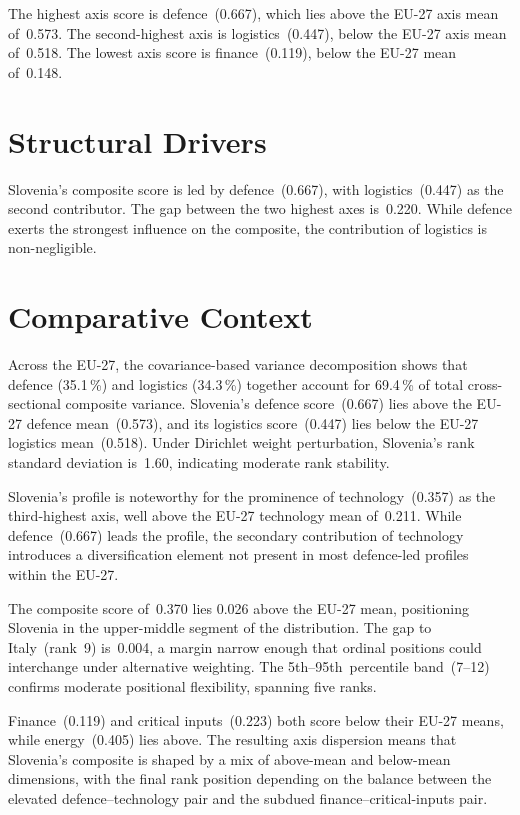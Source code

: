 \documentclass[12pt,a4paper]{article}
\begin{document}
The highest axis score is defence~(0.667), which lies above the EU-27 axis mean of~0.573.  The second-highest axis is logistics~(0.447), below the EU-27 axis mean of~0.518.  The lowest axis score is finance~(0.119), below the EU-27 mean of~0.148.


\section{Structural Drivers}
\label{sec:drivers}

\begin{sloppypar}
Slovenia's composite score is led by defence~(0.667), with logistics~(0.447) as the second contributor.  The gap between the two highest axes is~0.220.  While defence exerts the strongest influence on the composite, the contribution of logistics is non-negligible.
\end{sloppypar}


\section{Comparative Context}
\label{sec:comparative}

Across the EU-27, the covariance-based variance decomposition shows that defence (35.1\,\%) and logistics (34.3\,\%) together account for 69.4\,\% of total cross-sectional composite variance.  Slovenia's defence score~(0.667) lies above the EU-27 defence mean~(0.573), and its logistics score~(0.447) lies below the EU-27 logistics mean~(0.518).  Under Dirichlet weight perturbation, Slovenia's rank standard deviation is~1.60, indicating moderate rank stability.



Slovenia's profile is noteworthy for the prominence of technology~(0.357) as the third-highest axis, well above the EU-27 technology mean of~0.211.  While defence~(0.667) leads the profile, the secondary contribution of technology introduces a diversification element not present in most defence-led profiles within the EU-27.

The composite score of~0.370 lies 0.026 above the EU-27 mean, positioning Slovenia in the upper-middle segment of the distribution.  The gap to Italy~(rank~9) is~0.004, a margin narrow enough that ordinal positions could interchange under alternative weighting.  The 5th--95th~percentile band~(7--12) confirms moderate positional flexibility, spanning five ranks.

Finance~(0.119) and critical inputs~(0.223) both score below their EU-27 means, while energy~(0.405) lies above.  The resulting axis dispersion means that Slovenia's composite is shaped by a mix of above-mean and below-mean dimensions, with the final rank position depending on the balance between the elevated defence--technology pair and the subdued finance--critical-inputs pair.
\end{document}
